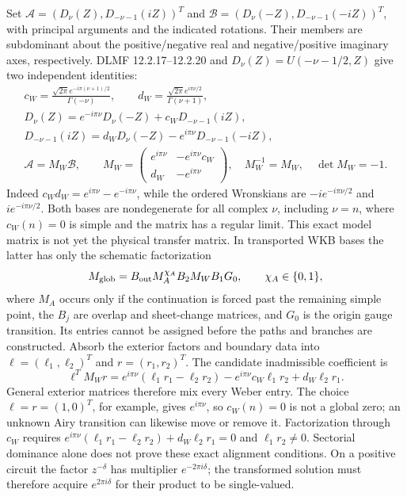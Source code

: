 \documentclass[11pt]{article}
\theoremstyle{remark}
\begin{document}
Set \(\mathcal A=(D_\nu(Z),D_{-\nu-1}(iZ))^T\) and
\(\mathcal B=(D_\nu(-Z),D_{-\nu-1}(-iZ))^T\), with principal arguments and
the indicated rotations.  Their members are subdominant about the
positive/negative real and negative/positive imaginary axes, respectively.
DLMF 12.2.17--12.2.20 \cite{DLMF12} and
\(D_\nu(Z)=U(-\nu-1/2,Z)\) give two independent identities:
\begin{equation}
 \begin{gathered}
 c_W=\frac{\sqrt{2\pi}e^{-i\pi(\nu+1)/2}}{\Gamma(-\nu)},\qquad
 d_W=\frac{\sqrt{2\pi}e^{i\pi\nu/2}}{\Gamma(\nu+1)},\\
 D_\nu(Z)=e^{-i\pi\nu}D_\nu(-Z)+c_WD_{-\nu-1}(iZ),\\
 D_{-\nu-1}(iZ)=d_WD_\nu(-Z)-e^{i\pi\nu}D_{-\nu-1}(-iZ),\\
 \mathcal A=M_W\mathcal B,\qquad
 M_W=\begin{pmatrix}e^{i\pi\nu}&-e^{i\pi\nu}c_W\\
 d_W&-e^{i\pi\nu}\end{pmatrix},\quad
 M_W^{-1}=M_W,\quad\det M_W=-1.
 \end{gathered}
 \label{eq:fedoryuk-weber-matrix}
\end{equation}
Indeed \(c_Wd_W=e^{i\pi\nu}-e^{-i\pi\nu}\), while the ordered
Wronskians are \(-ie^{-i\pi\nu/2}\) and \(ie^{-i\pi\nu/2}\).  Both
bases are nondegenerate for all complex \(\nu\), including \(\nu=n\),
where \(c_W(n)=0\) is simple and the matrix has a regular limit.  This exact
model matrix is not yet the physical transfer matrix.  In transported WKB
bases the latter has only the schematic factorization
\begin{equation}
 M_{\rm glob}=B_{\rm out}M_A^{\chi_A}B_2M_WB_1G_0,
 \qquad \chi_A\in\{0,1\},
 \label{eq:fedoryuk-global-matrix-scheme}
\end{equation}
where \(M_A\) occurs only if the continuation is forced past the remaining
simple point, the \(B_j\) are overlap and sheet-change matrices, and \(G_0\)
is the origin gauge transition.  Its entries cannot be assigned before the
paths and branches are constructed.  Absorb the exterior factors and
boundary data into \(\ell=(\ell_1,\ell_2)^T\) and
\(r=(r_1,r_2)^T\).  The candidate inadmissible coefficient is
\begin{equation}
 \ell^TM_Wr=e^{i\pi\nu}(\ell_1r_1-\ell_2r_2)
 -e^{i\pi\nu}c_W\ell_1r_2+d_W\ell_2r_1.
 \label{eq:fedoryuk-global-contraction}
\end{equation}
General exterior matrices therefore mix every Weber entry.  The choice
\(\ell=r=(1,0)^T\), for example, gives \(e^{i\pi\nu}\), so
\(c_W(n)=0\) is not a global zero; an unknown Airy transition can likewise
move or remove it.  Factorization through \(c_W\) requires
\(e^{i\pi\nu}(\ell_1r_1-\ell_2r_2)+d_W\ell_2r_1=0\) and
\(\ell_1r_2\ne0\).  Sectorial dominance alone does not prove these exact
alignment conditions.  On a positive circuit the factor
\(z^{-\delta}\) has multiplier \(e^{-2\pi i\delta}\); the transformed
solution must therefore acquire \(e^{2\pi i\delta}\) for their product to be
single-valued.
\end{document}
